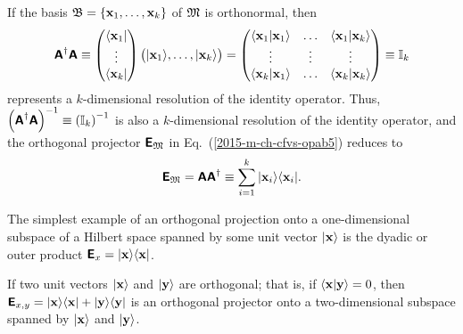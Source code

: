 If the basis ${\frak B}= \left\{{\bf x}_1,\ldots ,{\bf x}_k \right\}$ of ${\frak M}$
is orthonormal, then
\begin{equation}
\begin{split}
\textsf{\textbf{A}}^\dagger
\textsf{\textbf{A}}
\equiv
\begin{pmatrix}
\langle {\bf x}_1 \vert \\ \vdots \\ \langle {\bf x}_k \vert
\end{pmatrix}
\begin{pmatrix}
\vert {\bf x}_1\rangle , \ldots , \vert {\bf x}_k \rangle
\end{pmatrix}
=
\begin{pmatrix}
\langle {\bf x}_1 \vert {\bf x}_1\rangle   & \ldots &    \langle {\bf x}_1 \vert {\bf x}_k\rangle \\
\vdots &  \vdots &   \vdots \\
\langle {\bf x}_k \vert {\bf x}_1\rangle   & \ldots &    \langle {\bf x}_k \vert {\bf x}_k\rangle \\
\end{pmatrix}
\equiv
{\Bbb I}_k
\end{split}
\end{equation}
represents a $k$-dimensional resolution of the identity operator.
Thus, $\left(\textsf{\textbf{A}}^\dagger  \textsf{\textbf{A}} \right)^{-1}\equiv \left({\Bbb I}_k\right)^{-1}$
is also a $k$-dimensional resolution of the identity operator,
and the orthogonal projector $\textsf{\textbf{E}}_{{\frak M}}$
in Eq.~(\ref{2015-m-ch-cfvs-opab5})
reduces to
\begin{equation}
\textsf{\textbf{E}}_{{\frak M}}=
\textsf{\textbf{A}}   \textsf{\textbf{A}}^\dagger
\equiv
\sum_{i=1}^k \vert {\bf x}_i \rangle \langle {\bf x}_i \vert
.
\end{equation}



{\color{blue}
\bexample
The simplest example of an orthogonal projection onto a one-dimensional subspace of a Hilbert space
spanned by some unit vector $\vert {\bf x} \rangle$ is the dyadic or outer product
$
\textsf{\textbf{E}}_x = \vert {\bf x} \rangle  \langle {\bf x} \vert$.

If two unit vectors $\vert {\bf x} \rangle$ and $\vert {\bf y} \rangle$ are orthogonal;
that is, if $\langle {\bf x} \vert {\bf y} \rangle = 0$, then
$\textsf{\textbf{E}}_{x,y} = \vert {\bf x} \rangle  \langle {\bf x} \vert  +  \vert {\bf y} \rangle  \langle {\bf y} \vert$
is an orthogonal projector onto a two-dimensional subspace spanned by $\vert {\bf x} \rangle$ and $\vert {\bf y} \rangle$.
\eexample
}

